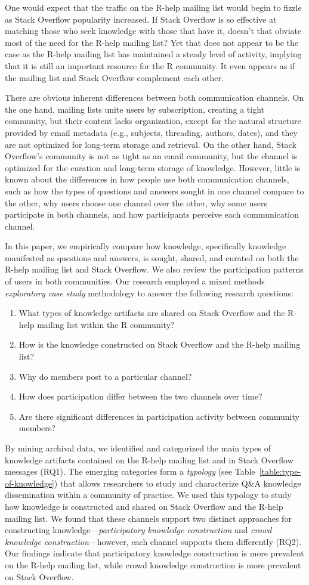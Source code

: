 \documentclass[smallextended]{svjour3}       %
\newcommand{\channel}{communication channel\xspace}
\newcommand{\channels}{communication channels\xspace}
\newcommand{\SO}{Stack Overflow\xspace}
\newcommand{\RH}{R-help\xspace}
\newcommand{\rqa}{What types of knowledge artifacts are shared on Stack Overflow and the R-help mailing list within the R community?}
\newcommand{\rqb}{How is the knowledge constructed on Stack Overflow and the R-help mailing list?}
\newcommand{\rqc}{Why do members post to a particular channel?}
\newcommand{\rqd}{How does participation differ between the two channels over time?}
\newcommand{\rqe}{Are there significant differences in participation activity between community members?}
\begin{document}
One would expect that the traffic on the \RH mailing list would begin
to fizzle as \SO popularity increased. If \SO is so effective at
matching those who seek knowledge with those that have it, doesn't
that obviate most of the need for the \RH mailing list? Yet that does
not appear to be the case as the \RH mailing list has maintained a
steady level of activity, implying that it is still an important resource for the R
community. It even appears as if the mailing list and \SO complement
each other.

There are obvious inherent differences between both \channels. On the one hand, mailing lists unite users by subscription, creating a tight community, but their content lacks organization, except for the natural structure provided by email metadata (e.g., subjects, threading, authors, dates), and they are not optimized for long-term storage and retrieval. On the other hand, \SO's community is not as tight as an email community, but the channel is optimized for the curation and long-term storage of knowledge. However, little is known about the differences in how people use both \channels, such as how the types of questions and answers sought in one channel compare to the other, why users choose one channel over the other, why some users participate in both channels, and how participants perceive each \channel.



In this paper, we empirically compare how
knowledge, specifically knowledge manifested as questions and answers,
is sought, shared, and curated on both the \RH mailing list and
\SO.  We also review the participation patterns of users in both
communities. 
Our research employed a mixed methods \textit{exploratory case study}
methodology to answer the following research questions:

\begin{enumerate}[label=\bfseries{RQ\arabic*.},itemsep=3pt, topsep=2pt, leftmargin=3em, parsep=0pt]
\item \rqa
\item \rqb
\item \rqc
\item \rqd
\item \rqe
\end{enumerate}

By mining archival data, we identified and categorized the main types
of knowledge artifacts contained on the \RH mailing list and in \SO
messages (RQ1). The emerging categories form a \textit{typology} (see
Table~\ref{table:type-of-knowledge}) that
allows researchers to study and characterize Q\&A knowledge
dissemination within a community of practice. We used this typology to
study how knowledge is constructed and shared on \SO and the \RH
mailing list. We found that these channels support two distinct
approaches for constructing knowledge---\textit{participatory
  knowledge construction} and \textit{crowd knowledge
  construction}---however, each channel supports them differently
(RQ2). Our findings indicate that participatory knowledge construction
is more prevalent on the \RH mailing list, while crowd knowledge construction is more
prevalent on \SO.
\end{document}
